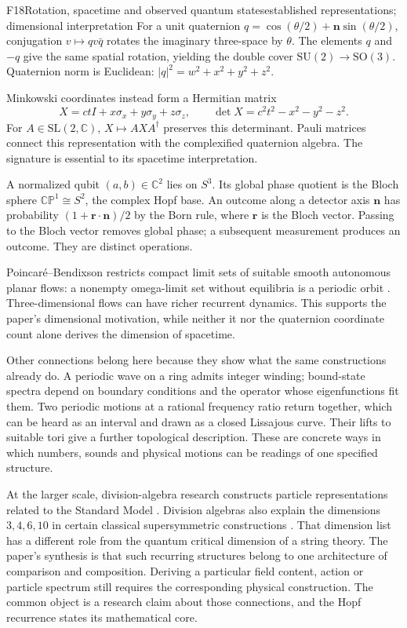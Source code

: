 \documentclass[11pt,a4paper]{article}
\newcommand{\C}{\mathbb{C}}
\newcommand{\SU}{\mathrm{SU}}
\newcommand{\SO}{\mathrm{SO}}
\begin{document}
\begin{formal}{F18}{Rotation, spacetime and observed quantum states}{established representations; dimensional interpretation}
For a unit quaternion $q=\cos(\theta/2)+\mathbf n\sin(\theta/2)$, conjugation
$v\mapsto qv\bar q$ rotates the imaginary three-space by $\theta$.
The elements $q$ and $-q$ give the same spatial rotation, yielding the double
cover $\SU(2)\to\SO(3)$. Quaternion norm is Euclidean:
$|q|^2=w^2+x^2+y^2+z^2$.

Minkowski coordinates instead form a Hermitian matrix
\begin{equation}
 X=ctI+x\sigma_x+y\sigma_y+z\sigma_z,
 \qquad \det X=c^2t^2-x^2-y^2-z^2.
\end{equation}
For $A\in\mathrm{SL}(2,\C)$, $X\mapsto AXA^\dagger$ preserves this
determinant. Pauli matrices connect this representation with the complexified
quaternion algebra. The signature is essential to its spacetime interpretation.

A normalized qubit $(a,b)\in\C^2$ lies on $S^3$. Its global phase quotient
is the Bloch sphere $\mathbb{CP}^1\cong S^2$, the complex Hopf base. An outcome
along a detector axis $\mathbf n$ has probability
$(1+\mathbf r\cdot\mathbf n)/2$ by the Born rule, where $\mathbf r$ is the
Bloch vector. Passing to the Bloch vector removes global phase; a subsequent
measurement produces an outcome. They are distinct operations.

Poincar\'e--Bendixson restricts compact limit sets of suitable smooth autonomous
planar flows: a nonempty omega-limit set without equilibria is a periodic
orbit \citep{Sideris2013}. Three-dimensional flows can have richer recurrent
dynamics. This supports the paper's dimensional motivation, while neither it
nor the quaternion coordinate count alone derives the dimension of spacetime.
\end{formal}

Other connections belong here because they show what the same constructions
already do. A periodic wave on a ring admits integer winding; bound-state
spectra depend on boundary conditions and the operator whose eigenfunctions
fit them. Two periodic motions at a rational frequency ratio return together,
which can be heard as an interval and drawn as a closed Lissajous curve.
Their lifts to suitable tori give a further topological description. These
are concrete ways in which numbers, sounds and physical motions can be readings
of one specified structure.

At the larger scale, division-algebra research constructs particle
representations related to the Standard Model \citep{Furey2016}. Division
algebras also explain the dimensions $3,4,6,10$ in certain classical
supersymmetric constructions \citep{BaezHuerta2009}. That dimension list has
a different role from the quantum critical dimension of a string theory.
The paper's synthesis is that such recurring structures belong to one
architecture of comparison and composition. Deriving a particular field
content, action or particle spectrum still requires the corresponding physical
construction. The common object is a research claim about those connections,
and the Hopf recurrence states its mathematical core.
\end{document}
